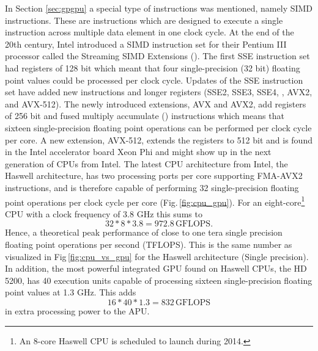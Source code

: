 In Section \ref{sec:gpgpu} a special type of instructions was mentioned, namely SIMD instructions. These are instructions which are designed to execute a single instruction across multiple data element in one clock cycle. At the end of the 20th century, Intel introduced a SIMD instruction set for their Pentium III processor called the Streaming SIMD Extensions (). The first SSE instruction set had registers of 128 bit which meant that four single-precision (32 bit) floating point values could be processed per clock cycle. Updates of the SSE instruction set have added new instructions and longer registers (SSE2, SSE3, SSE4, , AVX2, and AVX-512). The newly introduced extensions, AVX and AVX2, add registers of 256 bit and fused multiply accumulate () instructions  which means that sixteen single-precision floating point operations can be performed per clock cycle per core. A new extension, AVX-512, extends the registers to 512 bit and is found in the Intel accelerator board  Xeon Phi and might show up in the next generation of CPUs from Intel. The latest CPU architecture from Intel, the Haswell architecture, has two processing ports per core supporting FMA-AVX2 instructions, and is therefore capable of performing 32 single-precision floating point operations per clock cycle per core (Fig.\,\ref{fig:cpu_gpu}). For an eight-core\footnote{An 8-core Haswell CPU is scheduled to launch during 2014.} CPU with a clock frequency of 3.8 GHz this sums to 
\begin{equation}
32*8*3.8 = 972.8\,\text{GFLOPS}.
\end{equation}
Hence, a theoretical peak performance of close to one tera single precision floating point operations per second (TFLOPS). This is the same number as visualized in Fig\,\ref{fig:cpu_vs_gpu} for the Haswell architecture (Single precision). In addition, the most powerful integrated GPU found on Haswell CPUs, the HD 5200, has 40 execution units capable of processing sixteen single-precision floating point values at 1.3 GHz. This adds
\begin{equation}
16*40*1.3 = 832\,\text{GFLOPS}
\end{equation}
in extra processing power to the APU.

